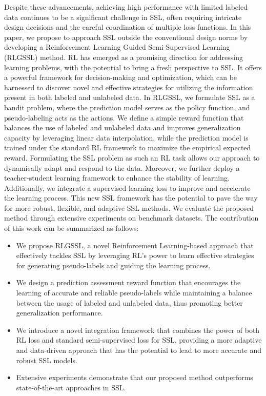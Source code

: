 Despite these advancements, achieving high performance with limited labeled data continues to be a significant challenge in SSL, often requiring intricate design decisions and the careful coordination of multiple loss functions. 
In this paper,
we propose to approach SSL outside the conventional design norms by 
developing a Reinforcement Learning Guided Semi-Supervised Learning (RLGSSL) method.
RL has emerged as a promising direction for addressing learning problems, with the potential to bring a fresh perspective to SSL. 
It offers a powerful framework for decision-making and optimization, which can be harnessed to discover novel and effective strategies for utilizing the information present in both labeled and unlabeled data. 
In RLGSSL, we formulate SSL as a bandit problem, 
where the prediction model serves as the policy function, and pseudo-labeling acts as the actions. 
We define a simple reward function that balances the use of labeled and unlabeled data 
and improves generalization capacity 
by leveraging linear data interpolation,
while the prediction model is trained under the standard RL framework to maximize
the empirical expected reward.
Formulating the SSL problem as such an RL task allows our approach to
dynamically adapt and respond to the data. 
Moreover, 
we further deploy a teacher-student learning framework to enhance 
the stability of learning. 
Additionally, we integrate a supervised learning loss to improve and accelerate the learning process. 
This new SSL framework has the potential to pave the way for more robust, flexible, and adaptive SSL methods.
We evaluate the proposed method through extensive experiments on benchmark datasets.
The contribution of this work can be summarized as follows:
\begin{itemize}
    \item 
We propose RLGSSL, a novel Reinforcement Learning-based approach that effectively tackles SSL 
by leveraging RL's power to learn effective strategies for generating pseudo-labels and guiding the learning process.


    \item We design a prediction assessment reward function that encourages the learning of 
	    accurate and reliable pseudo-labels 
	    while maintaining a balance between the usage of labeled and unlabeled data, thus promoting better generalization performance.
    \item
	  We introduce a novel integration framework that combines the power of 
		both RL loss and standard semi-supervised loss for SSL, 
		providing a more adaptive and data-driven approach 
that has the potential to lead to more accurate and robust SSL models.
    \item 
	    Extensive experiments demonstrate that our proposed method outperforms state-of-the-art approaches in SSL.
\end{itemize}



